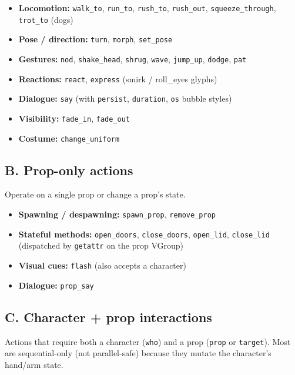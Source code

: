 \documentclass[
  11pt,
]{book}
\providecommand{\tightlist}{%
  \setlength{\itemsep}{0pt}\setlength{\parskip}{0pt}}
\begin{document}
\begin{itemize}
\tightlist
\item
  \textbf{Locomotion:} \texttt{walk\_to}, \texttt{run\_to},
  \texttt{rush\_to}, \texttt{rush\_out}, \texttt{squeeze\_through},
  \texttt{trot\_to} (dogs)
\item
  \textbf{Pose / direction:} \texttt{turn}, \texttt{morph},
  \texttt{set\_pose}
\item
  \textbf{Gestures:} \texttt{nod}, \texttt{shake\_head}, \texttt{shrug},
  \texttt{wave}, \texttt{jump\_up}, \texttt{dodge}, \texttt{pat}
\item
  \textbf{Reactions:} \texttt{react}, \texttt{express} (smirk /
  roll\_eyes glyphs)
\item
  \textbf{Dialogue:} \texttt{say} (with \texttt{persist},
  \texttt{duration}, \texttt{os} bubble styles)
\item
  \textbf{Visibility:} \texttt{fade\_in}, \texttt{fade\_out}
\item
  \textbf{Costume:} \texttt{change\_uniform}
\end{itemize}

\subsection{B. Prop-only actions}\label{b.-prop-only-actions}

Operate on a single prop or change a prop's state.

\begin{itemize}
\tightlist
\item
  \textbf{Spawning / despawning:} \texttt{spawn\_prop},
  \texttt{remove\_prop}
\item
  \textbf{Stateful methods:} \texttt{open\_doors},
  \texttt{close\_doors}, \texttt{open\_lid}, \texttt{close\_lid}
  (dispatched by \texttt{getattr} on the prop VGroup)
\item
  \textbf{Visual cues:} \texttt{flash} (also accepts a character)
\item
  \textbf{Dialogue:} \texttt{prop\_say}
\end{itemize}

\subsection{C. Character + prop
interactions}\label{c.-character-prop-interactions}

Actions that require both a character (\texttt{who}) and a prop
(\texttt{prop} or \texttt{target}). Most are sequential-only (not
parallel-safe) because they mutate the character's hand/arm state.
\end{document}
